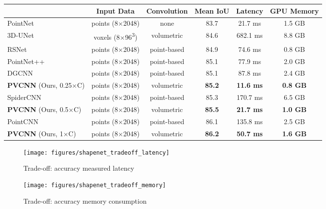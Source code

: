 \documentclass{article}
\def\modelshort{PVCNN\xspace}
\begin{document}
\begin{table*}[!t]
\setlength{\tabcolsep}{6.5pt}
\small\centering
\begin{tabular}{lccccc}
    \toprule
    & Input Data & Convolution & Mean IoU & Latency & GPU Memory \\
    \midrule
    PointNet~\cite{Qi:2017vq} & points (8$\times$2048) & none & 83.7 & 21.7 ms & 1.5 GB\\
    3D-UNet~\cite{Cicek:2016un} & voxels (8$\times$96\textsuperscript{3}) & volumetric & 84.6 & 682.1 ms & 8.8 GB\\
    RSNet~\cite{Huang:2018rs} & points (8$\times$2048) & point-based & 84.9 & 74.6 ms & 0.8 GB\\
    PointNet++~\cite{Qi:2017tf} & points (8$\times$2048) & point-based & 85.1 & 77.9 ms & 2.0 GB\\
    DGCNN~\cite{Wang:2018dg} & points (8$\times$2048) & point-based & 85.1 & 87.8 ms & 2.4 GB \\
    \textbf{\modelshort} (Ours, 0.25$\times$C) & points (8$\times$2048) & volumetric & \textbf{85.2} & \textbf{11.6 ms} & \textbf{0.8 GB} \\
    \midrule
    SpiderCNN~\cite{Xu:2018sp} & points (8$\times$2048) & point-based & 85.3 & 170.7 ms & 6.5 GB \\
    \textbf{\modelshort} (Ours, 0.5$\times$C) & points (8$\times$2048) & volumetric & \textbf{85.5} & \textbf{21.7 ms} & \textbf{1.0 GB} \\
    \midrule
PointCNN~\cite{Li:2018tp} &  points (8$\times$2048) & point-based & 86.1 & 135.8 ms & 2.5 GB \\
    \textbf{\modelshort} (Ours, 1$\times$C) & points (8$\times$2048) & volumetric & \textbf{86.2} & \textbf{50.7 ms} & \textbf{1.6 GB} \\
    \bottomrule
\end{tabular}
\caption{Results of object part segmentation on ShapeNet Part. On average, \modelshort outperforms the point-based models with \textbf{5.5$\times$} measured speedup and \textbf{3$\times$} memory reduction, and outperforms the voxel-based baseline with \textbf{59$\times$} measured speedup and \textbf{11$\times$} memory reduction.}
\label{tab:shapenet_results}
\vspace{-5pt}
\end{table*} \begin{figure*}[!t]
    \centering
    \begin{subfigure}{0.49\textwidth}
        \centering
        \texttt{[image: figures/shapenet\_tradeoff\_latency]}
        \caption{Trade-off: accuracy \vs measured latency}
    \end{subfigure}
    \hfill
    \begin{subfigure}{0.49\textwidth}
        \centering
        \texttt{[image: figures/shapenet\_tradeoff\_memory]}
        \caption{Trade-off: accuracy \vs memory consumption}
    \end{subfigure}
    \caption{Comparisons between \modelshort and point/voxel-based baselines on ShapeNet Part.}
    \label{fig:shapenet_tradeoffs}
    \vspace{-10pt}
\end{figure*}
 
\end{document}
